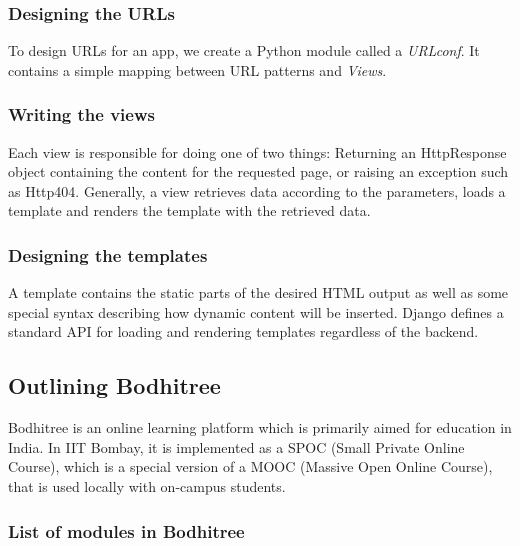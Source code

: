 \subsubsection*{Designing the URLs}
\hspace{0.35cm} To design URLs for an app, we create a Python module called a \emph{URLconf}. It contains a simple mapping between URL patterns and \emph{Views}.

\subsubsection*{Writing the views}
\hspace{0.35cm} Each view is responsible for doing one of two things: Returning an HttpResponse object containing the content for the requested page, or raising an exception such as Http404. Generally, a view retrieves data according to the parameters, loads a template and renders the template with the retrieved data.

\subsubsection*{Designing the templates}
\hspace{0.35cm} A template contains the static parts of the desired HTML output as well as some special syntax describing how dynamic content will be inserted. Django defines a standard API for loading and rendering templates regardless of the backend.

\subsection{Outlining Bodhitree}
\hspace{0.35cm} Bodhitree is an online learning platform which is primarily aimed for education in India. In IIT Bombay, it is implemented as a SPOC (Small Private Online Course), which is a special version of a MOOC (Massive Open Online Course), that is used locally with on-campus students.

\subsubsection*{List of modules in Bodhitree}

